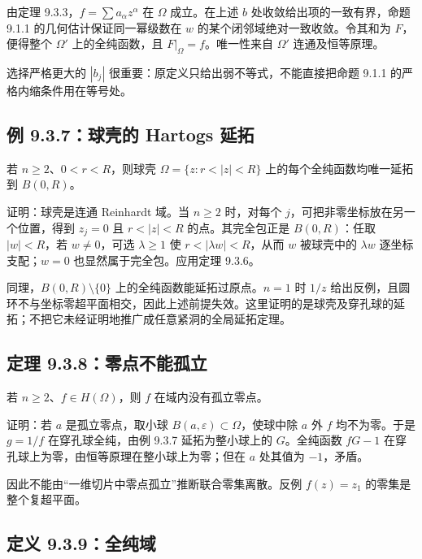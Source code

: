 \documentclass[11pt,a4paper]{article}
\begin{document}
由定理 9.3.3，\(f=\sum a_\alpha z^\alpha\) 在 \(\Omega\) 成立。在上述
\(b\) 处收敛给出项的一致有界，命题 9.1.1 的几何估计保证同一幂级数在
\(w\) 的某个闭邻域绝对一致收敛。令其和为 \(F\)，便得整个 \(\Omega'\)
上的全纯函数，且 \(F|_\Omega=f\)。唯一性来自 \(\Omega'\)
连通及恒等原理。

选择严格更大的 \(|b_j|\) 很重要：原定义只给出弱不等式，不能直接把命题
9.1.1 的严格内缩条件用在等号处。

\subsection{例 9.3.7：球壳的 Hartogs 延拓}\label{ch09-s3-heading-7}

若 \(n\ge2\)、\(0<r<R\)，则球壳 \(\Omega=\{z:r<|z|<R\}\)
上的每个全纯函数均唯一延拓到 \(B(0,R)\)。

证明：球壳是连通 Reinhardt 域。当 \(n\ge2\) 时，对每个
\(j\)，可把非零坐标放在另一个位置，得到 \(z_j=0\) 且 \(r<|z|<R\)
的点。其完全包正是 \(B(0,R)\)：任取 \(|w|<R\)，若 \(w\ne0\)，可选
\(\lambda\ge1\) 使 \(r<|\lambda w|<R\)，从而 \(w\) 被球壳中的
\(\lambda w\) 逐坐标支配；\(w=0\) 也显然属于完全包。应用定理 9.3.6。

同理，\(B(0,R)\setminus\{0\}\) 上的全纯函数能延拓过原点。\(n=1\) 时
\(1/z\)
给出反例，且圆环不与坐标零超平面相交，因此上述前提失效。这里证明的是球壳及穿孔球的延拓；不把它未经证明地推广成任意紧洞的全局延拓定理。

\subsection{定理 9.3.8：零点不能孤立}\label{ch09-s3-heading-8}

若 \(n\ge2\)、\(f\in H(\Omega)\)，则 \(f\) 在域内没有孤立零点。

证明：若 \(a\) 是孤立零点，取小球
\(B(a,\varepsilon)\subset\Omega\)，使球中除 \(a\) 外 \(f\)
均不为零。于是 \(g=1/f\) 在穿孔球全纯，由例 9.3.7 延拓为整小球上的
\(G\)。全纯函数 \(fG-1\) 在穿孔球上为零，由恒等原理在整小球上为零；但在
\(a\) 处其值为 \(-1\)，矛盾。

因此不能由``一维切片中零点孤立''推断联合零集离散。反例 \(f(z)=z_1\)
的零集是整个复超平面。

\subsection{定义 9.3.9：全纯域}\label{ch09-s3-heading-9}
\end{document}

